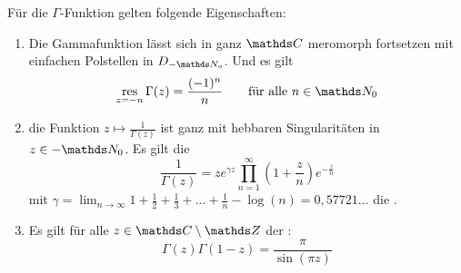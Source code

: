 \begin{satz}\label{satz:gamma-eigenschaften}
Für die $\Gamma$-Funktion gelten folgende Eigenschaften:
\begin{enumerate}
\item Die Gammafunktion lässt sich in ganz $\CC$ meromorph fortsetzen mit einfachen Polstellen in $D_{-\NN_o}$. Und es gilt
\[
	\res_{z=-n} \Gamma(z)
	= \frac{(-1)^n}{n}
	\qquad \text{für alle } n\in\NN_0
\]

\item die Funktion $z\mapsto \frac{1}{\Gamma(z)}$ ist ganz mit hebbaren Singularitäten in $z\in-\NN_0$. Es gilt die 
\[
	\frac{1}{\Gamma(z)} = ze^{\gamma z} \prod_{n=1}^\infty \left(1+\frac{z}{n}\right)e^{-\frac{z}{n}}
\]
mit $\gamma = \lim_{n\to\infty} 1 + \frac{1}{2} + \frac{1}{3} + \ldots + \frac{1}{n} - \log(n) = 0,57721\dots$ die .

\item Es gilt für alle $z\in\CC\setminus\ZZ$ der :
\[
	\Gamma(z)\Gamma(1-z)
	= \frac{\pi}{\sin(\pi z)}
\]
\end{enumerate}
\end{satz}

